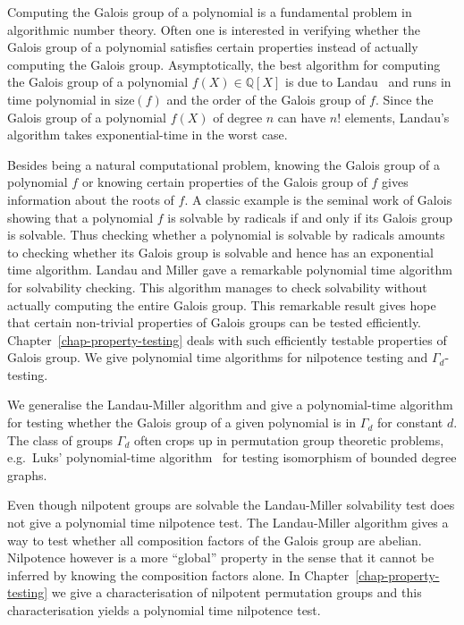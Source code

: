 \documentclass[11pt]{madras}%
\theoremstyle{remark}
\newcommand{\size}[1]{{\ensuremath{\mathrm{size}\left(#1\right)}}}
\begin{document}
Computing the Galois group of a polynomial is a fundamental problem in
algorithmic number theory.  Often one is interested in verifying
whether the Galois group of a polynomial satisfies certain properties
instead of actually computing the Galois group.  Asymptotically, the
best algorithm for computing the Galois group of a polynomial $f(X)
\in \mathbb{Q}[X]$ is due to Landau~\cite{landau84galois} and runs in
time polynomial in $\size{f}$ and the order of the Galois group of
$f$.  Since the Galois group of a polynomial $f(X)$ of degree $n$ can
have $n!$ elements, Landau's algorithm takes exponential-time in the
worst case.

Besides being a natural computational problem, knowing the Galois
group of a polynomial $f$ or knowing certain properties of the Galois
group of $f$ gives information about the roots of $f$. A classic
example is the seminal work of Galois showing that a polynomial $f$ is
solvable by radicals if and only if its Galois group is solvable. Thus
checking whether a polynomial is solvable by radicals amounts to
checking whether its Galois group is solvable and hence has an
exponential time algorithm.  Landau and Miller
\cite{landau85solvability} gave a remarkable polynomial time algorithm
for solvability checking. This algorithm manages to check solvability
without actually computing the entire Galois group. This remarkable
result gives hope that certain non-trivial properties of Galois groups
can be tested efficiently.  Chapter~\ref{chap-property-testing} deals
with such efficiently testable properties of Galois group.  We give
polynomial time algorithms for nilpotence testing and
$\Gamma_d$-testing.

We generalise the Landau-Miller algorithm and give a polynomial-time
algorithm for testing whether the Galois group of a given polynomial
is in $\Gamma_d$ for constant $d$.  The class of groups $\Gamma_d$
often crops up in permutation group theoretic problems, e.g.\ Luks'
polynomial-time algorithm~\cite{luks82bounded} for testing isomorphism
of bounded degree graphs.

Even though nilpotent groups are solvable the Landau-Miller
solvability test does not give a polynomial time nilpotence test.  The
Landau-Miller algorithm gives a way to test whether all composition
factors of the Galois group are abelian. Nilpotence however is a more
``global'' property in the sense that it cannot be inferred by knowing
the composition factors alone. In Chapter~\ref{chap-property-testing}
we give a characterisation of nilpotent permutation groups and this
characterisation yields a polynomial time nilpotence test.
\end{document}
